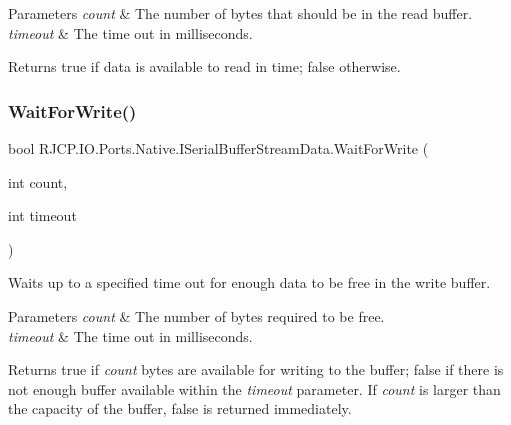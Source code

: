 \begin{DoxyParams}{Parameters}
{\em count} & The number of bytes that should be in the read buffer.\\
\hline
{\em timeout} & The time out in milliseconds.\\
\hline
\end{DoxyParams}
\begin{DoxyReturn}{Returns}
{\ttfamily true} if data is available to read in time; {\ttfamily false} otherwise.
\end{DoxyReturn}
\mbox{\label{interface_r_j_c_p_1_1_i_o_1_1_ports_1_1_native_1_1_i_serial_buffer_stream_data_ae8b9e26ea5a73cedf4314708b8e12c0d}} 
\subsubsection{\texorpdfstring{WaitForWrite()}{WaitForWrite()}}
{\footnotesize\ttfamily bool R\+J\+C\+P.\+I\+O.\+Ports.\+Native.\+I\+Serial\+Buffer\+Stream\+Data.\+Wait\+For\+Write (\begin{DoxyParamCaption}\item[{int}]{count,  }\item[{int}]{timeout }\end{DoxyParamCaption})}



Waits up to a specified time out for enough data to be free in the write buffer. 


\begin{DoxyParams}{Parameters}
{\em count} & The number of bytes required to be free.\\
\hline
{\em timeout} & The time out in milliseconds.\\
\hline
\end{DoxyParams}
\begin{DoxyReturn}{Returns}
{\ttfamily true} if {\itshape count}  bytes are available for writing to the buffer; {\ttfamily false} if there is not enough buffer available within the {\itshape timeout}  parameter. If {\itshape count}  is larger than the capacity of the buffer, {\ttfamily false} is returned immediately.
\end{DoxyReturn}
\mbox{\label{interface_r_j_c_p_1_1_i_o_1_1_ports_1_1_native_1_1_i_serial_buffer_stream_data_a9499ef9e6a11233aa5f3855bff6c69b0}} 
